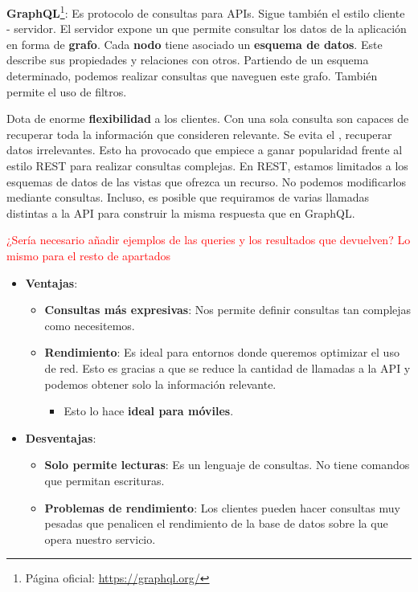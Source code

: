 \textbf{GraphQL}\footnote{Página oficial: \url{https://graphql.org/}}: Es protocolo de consultas para APIs. Sigue también el estilo cliente - servidor. El servidor expone un  que permite consultar los datos de la aplicación en forma de \textbf{grafo}. Cada \textbf{nodo} tiene asociado un \textbf{esquema de datos}. Este describe sus propiedades y relaciones con otros. Partiendo de un esquema determinado, podemos realizar consultas que naveguen este grafo. También permite el uso de filtros.

Dota de enorme \textbf{flexibilidad} a los clientes. Con una sola consulta son capaces de recuperar toda la información que consideren relevante. Se evita el \textbf{}, recuperar datos irrelevantes. \cite{porcelloLearningGraphQLDeclarative2021} Esto ha provocado que empiece a ganar popularidad frente al estilo REST para realizar consultas complejas. \cite{britoRESTVsGraphQL2020} En REST, estamos limitados a los esquemas de datos de las vistas que ofrezca un recurso. No podemos modificarlos mediante consultas. Incluso, es posible que requiramos de varias llamadas distintas a la API para construir la misma respuesta que en GraphQL.

\textcolor{red}{¿Sería necesario añadir ejemplos de las queries y los resultados que devuelven? Lo mismo para el resto de apartados}

\begin{itemize}
  \item \textbf{Ventajas}:

  \begin{itemize}
    \item \textbf{Consultas más expresivas}: Nos permite definir consultas tan complejas como necesitemos.

    \item \textbf{Rendimiento}: Es ideal para entornos donde queremos optimizar el uso de red. Esto es gracias a que se reduce la cantidad de llamadas a la API y podemos obtener solo la información relevante.

    \begin{itemize}
      \item Esto lo hace \textbf{ideal para móviles}.
    \end{itemize}

  \end{itemize}

  \item \textbf{Desventajas}:

  \begin{itemize}
    \item \textbf{Solo permite lecturas}: Es un lenguaje de consultas. No tiene comandos que permitan escrituras.

    \item \textbf{Problemas de rendimiento}: Los clientes pueden hacer consultas muy pesadas que penalicen el rendimiento de la base de datos sobre la que opera nuestro servicio.
  \end{itemize}
\end{itemize}

